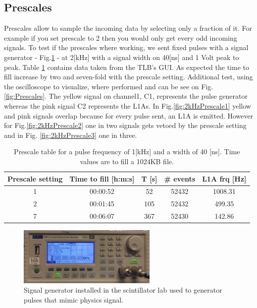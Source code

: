 \subsection{Prescales}
\label{Prescales}

Prescales allow to sample the incoming data by selecting only a fraction of it. For example if you set prescale to 2 then you would only get every odd incoming signals. To test if the prescales where working, we sent fixed pulses with a signal generator - Fig.\ref{fig:SignalGenerator} - at 2[kHz] with a signal width on 40[ns] and 1 Volt peak to peak. Table \ref{table:prescale} contains data taken from the TLB's GUI. As expected the time to fill increase by two and seven-fold with the prescale setting. Additional test, using the oscilloscope to visualize, where performed and can be see on Fig. \ref{fig:Prescales}. The yellow signal on channel1, C1, represents the pulse generator whereas the pink signal C2 represents the L1As. In  Fig.\ref{fig:2kHzPrescale1} yellow and pink signals overlap because for every pulse sent, an L1A is emitted. However for Fig.\ref{fig:2kHzPrescale2} one in two signals gets vetoed by the prescale setting and in Fig. \ref{fig:2kHzPrescale3} one in three.

\begin{table}[htbp!]
\caption{Prescale table for a pulse frequency of 1[kHz] and a width of 40 [ns]. Time values are to fill a 1024KB file.}
\centering
\label{table:prescale}
\begin{tabular}{c c c c c}
\toprule
Prescale setting & Time to fill [h:m:s] & T [s] & \# events & L1A frq [Hz] \\
\midrule
1 & 00:00:52 & 52 & 52432 & 1008.31 \\
2 & 00:01:45 & 105 & 52432 & 499.35 \\
7 & 00:06:07 & 367 & 52430 & 142.86 \\
\bottomrule
\end{tabular}
\end{table}


\begin{figure}[htbp!] 
\centering    
\includegraphics[width=0.6\textwidth]{SignalGenerator5Mhz.jpg}
\caption[Signal Generator]{Signal generator installed in the scintillator lab used to generator pulses that mimic physics signal.}
\label{fig:SignalGenerator}
\end{figure}

